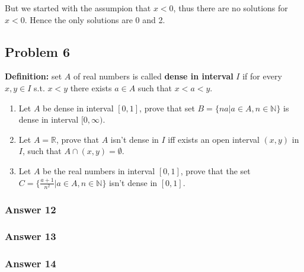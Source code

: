 \documentclass[11pt]{article}
\begin{document}
But we started with the assumpion that $x<0$, thus there are no solutions
for $x<0$.  Hence the only solutions are 0 and 2.
\subsection{Problem 6}
\label{sec-1-6}
\textbf{Definition:} set $A$ of real numbers is called \textbf{dense in interval} $I$ if
for every $x, y \in I$ s.t. $x < y$ there exists $a \in A$ such that
$x < a < y$.

\begin{enumerate}
\item Let $A$ be dense in interval $[0,1]$, prove that set 
      $B=\{na|a \in A, n \in \mathbb{N}\}$ is dense in interval $[0, \infty)$.
\item Let $A=\mathbb{R}$, prove that $A$ isn't dense in $I$ iff exists an
open interval $(x, y)$ in $I$, such that $A \cap (x, y) = \emptyset$.
\item Let $A$ be the real numbers in interval $[0,1]$, prove that the set
      $C=\{\frac{a+1}{n^2} | a \in A, n \in \mathbb{N}\}$ isn't dense in
      $[0,1]$.
\end{enumerate}

\subsubsection{Answer 12}
\label{sec-1-6-1}
\subsubsection{Answer 13}
\label{sec-1-6-2}
\subsubsection{Answer 14}
\label{sec-1-6-3}
\end{document}
